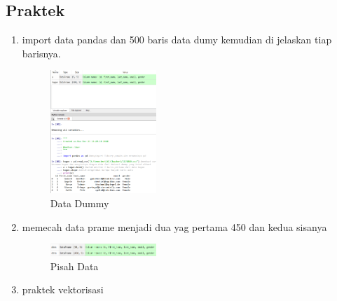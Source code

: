     \subsection{Praktek}
    \begin{enumerate}
        \item import data pandas dan 500 baris data dumy kemudian di jelaskan tiap barisnya. \hfill \break 
        
        \begin{figure}[H]
            \includegraphics[width=4cm]{figures/1174040/chapter4/1.png}
            \centering
            \caption{Data Dummy}
        \end{figure}

        \item memecah data prame menjadi dua yag pertama 450 dan kedua sisanya \hfill \break 
        
        \begin{figure}[H]
            \includegraphics[width=4cm]{figures/1174040/chapter4/2.png}
            \centering
            \caption{Pisah Data}
        \end{figure}

        \item praktek vektorisasi \hfill \break 
        

\end{enumerate}
